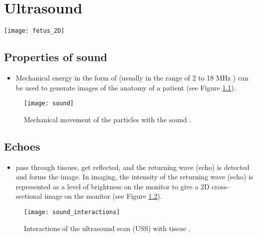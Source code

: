 \chapter{Ultrasound}
\vspace{-40ex}\hspace{35ex}
\texttt{[image: fetus\_2D]}

\section{Properties of sound}

\begin{itemize}
\item Mechanical energy in the form of  (usually in the range of 2 to 18 MHz
  \cite{abdulla2025sound})  can be
  used to generate images of the anatomy of a patient (see Figure
  \ref{fig:sound}).
\end{itemize}
\begin{figure}[!h]
  \centering
  \texttt{[image: sound]}
  \caption{Mechanical movement of the particles with the sound
    \cite{abdulla2025properties_sound}.\label{fig:sound}}
\end{figure}

\section{Echoes}
\begin{itemize}
\item {} pass
  through tissues, get reflected, and the returning wave (echo) is
  detected and forms the
  image\cite{bushberg2011essential,abdulla2025ultrasound_machine}. In
  imaging, the intensity of the returning wave (echo) is represented
  as a level of brightness on the monitor to give a 2D cross-sectional
  image on the monitor \cite{abdulla2025ultrasound} (see Figure
  \ref{fig:interactions}).
\end{itemize}
\begin{figure}[!h]
  \centering
  \texttt{[image: sound\_interactions]}
  \caption{Interactions of the ultrasound scan (USS) with tissue
    \cite{abdulla2025properties_sound}.\label{fig:interactions}}
\end{figure}

